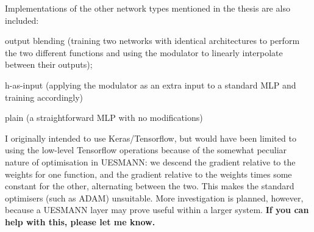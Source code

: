 Implementations of the other network types mentioned in the thesis are also included\+:


\begin{DoxyItemize}
\item output blending (training two networks with identical architectures to perform the two different functions and using the modulator to linearly interpolate between their outputs);
\item h-\/as-\/input (applying the modulator as an extra input to a standard M\+LP and training accordingly)
\item plain (a straightforward M\+LP with no modifications)
\end{DoxyItemize}

I originally intended to use Keras/\+Tensorflow, but would have been limited to using the low-\/level Tensorflow operations because of the somewhat peculiar nature of optimisation in U\+E\+S\+M\+A\+NN\+: we descend the gradient relative to the weights for one function, and the gradient relative to the weights times some constant for the other, alternating between the two. This makes the standard optimisers (such as A\+D\+AM) unsuitable. More investigation is planned, however, because a U\+E\+S\+M\+A\+NN layer may prove useful within a larger system. {\bfseries If you can help with this, please let me know.}

\href{https://travis-ci.com/jimfinnis/uesmanncpp}{\tt } 